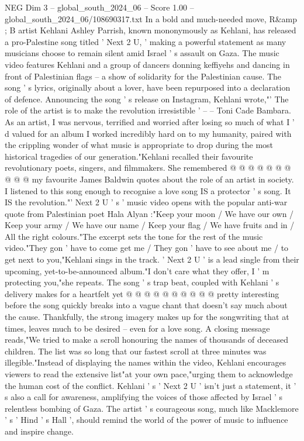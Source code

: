 \begin{textsample}{NEG Dim 3 – global\_south\_2024\_06 – Score 1.00 – global\_south\_2024\_06/108690317.txt}  \label{ex:f3_neg_112}
In a bold and much-needed move, R\&amp ; B artist Kehlani Ashley Parrish, known mononymously as Kehlani, has released a pro-Palestine song titled ' Next 2 U, ' making a powerful statement as many musicians choose to remain silent amid Israel ' s assault on Gaza.
The music video features Kehlani and a group of dancers donning keffiyehs and dancing in front of Palestinian flags -- a show of solidarity for the Palestinian cause.
The song ' s lyrics, originally about a lover, have been repurposed into a declaration of defence.
Announcing the song ' s release on Instagram, Kehlani wrote,"' The role of the artist is to make the revolution irresistible ' -- -- Toni Cade Bambara.
As an artist, I was nervous, terrified and worried after losing so much of what I ' d valued for an album I worked incredibly hard on to my humanity, paired with the crippling wonder of what music is appropriate to drop during the most historical tragedies of our generation."Kehlani recalled their favourite revolutionary poets, singers, and filmmakers.
She remembered @ @ @ @ @ @ @ @ @ @ my favourite James Baldwin quotes about the role of an artist in society.
I listened to this song enough to recognise a love song IS a protector ' s song.
It IS the revolution."' Next 2 U ' s ' music video opens with the popular anti-war quote from Palestinian poet Hala Alyan :"Keep your moon / We have our own / Keep your army / We have our name / Keep your flag / We have fruits and in / All the right colours."The excerpt sets the tone for the rest of the music video."They gon ' have to come get me / They gon ' have to see about me / to get next to you,"Kehlani sings in the track. ' Next 2 U ' is a lead single from their upcoming, yet-to-be-announced album."I don't care what they offer, I ' m protecting you,"she repeats.
The song ' s trap beat, coupled with Kehlani ' s delivery makes for a heartfelt yet @ @ @ @ @ @ @ @ @ @ pretty interesting before the song quickly breaks into a vague chant that doesn't say much about the cause.
Thankfully, the strong imagery makes up for the songwriting that at times, leaves much to be desired -- even for a love song.
A closing message reads,"We tried to make a scroll honouring the names of thousands of deceased children.
The list was so long that our fastest scroll at three minutes was illegible."Instead of displaying the names within the video, Kehlani encourages viewers to read the extensive list"at your own pace,"urging them to acknowledge the human cost of the conflict.
Kehlani ' s ' Next 2 U ' isn't just a statement, it ' s also a call for awareness, amplifying the voices of those affected by Israel ' s relentless bombing of Gaza.
The artist ' s courageous song, much like Macklemore ' s ' Hind ' s Hall ', should remind the world of the power of music to influence and inspire change.

\end{textsample}
